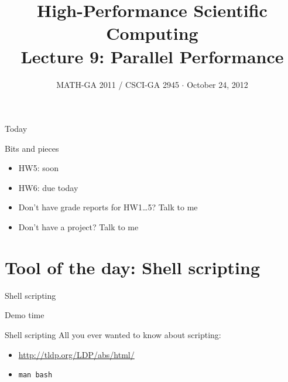 \documentclass[english,compress]{beamer}
\begin{document}

\title{High-Performance Scientific Computing\\Lecture 9: Parallel Performance}

\date{MATH-GA 2011 / CSCI-GA 2945 $\cdot$ October 24, 2012}

\frame{\titlepage}

\begin{frame}{Today}
  \tableofcontents[hideallsubsections]
\end{frame}
\begin{frame}{Bits and pieces}
  \begin{itemize}
    \item HW5: soon
    \item HW6: due today
    \item Don't have grade reports for HW1\dots5? Talk to me
    \item Don't have a project? Talk to me
  \end{itemize}
\end{frame}
\section[Software]{Tool of the day: Shell scripting}
\begin{frame}{Shell scripting}
  \begin{center}
  \Huge Demo time
  \end{center}
\end{frame}
\begin{frame}{Shell scripting}
  \Large
  All you ever wanted to know about scripting:

  \begin{itemize}
    \item \url{http://tldp.org/LDP/abs/html/}
    \item \texttt{man bash}
  \end{itemize}
\end{frame}
\end{document}
